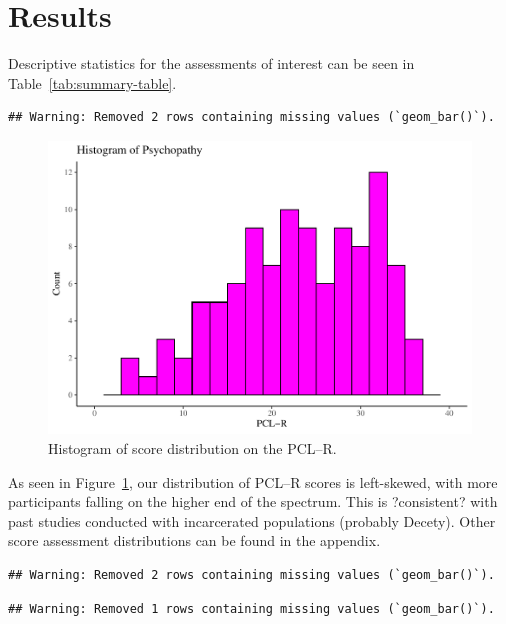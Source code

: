 \documentclass[
  man,floatsintext]{apa7}
\begin{document}
\hypertarget{results}{%
\section{Results}\label{results}}

Descriptive statistics for the assessments of interest can be seen in Table~\ref{tab:summary-table}.



\begin{verbatim}
## Warning: Removed 2 rows containing missing values (`geom_bar()`).
\end{verbatim}

\begin{figure}
\centering
\includegraphics{d2m-Psychopathy_files/figure-latex/PCLR-descriptives-1.pdf}
\caption{\label{fig:PCLR-descriptives}Histogram of score distribution on the PCL--R.}
\end{figure}

As seen in Figure~\ref{fig:PCLR-descriptives}, our distribution of PCL--R scores is left-skewed, with more participants falling on the higher end of the spectrum. This is ?consistent? with past studies conducted with incarcerated populations (probably Decety). Other score assessment distributions can be found in the appendix.

\begin{verbatim}
## Warning: Removed 2 rows containing missing values (`geom_bar()`).
\end{verbatim}

\begin{verbatim}
## Warning: Removed 1 rows containing missing values (`geom_bar()`).
\end{verbatim}
\end{document}

